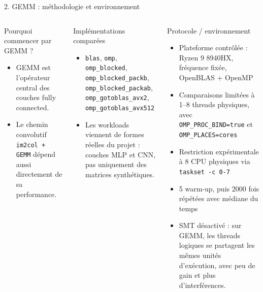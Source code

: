 \documentclass[aspectratio=169]{beamer}
\begin{document}
\begin{frame}{2. GEMM : méthodologie et environnement}
\scriptsize
\begin{columns}[T,totalwidth=\textwidth]
\begin{block}{Pourquoi commencer par GEMM ?}
\begin{itemize}
  \item GEMM est l'opérateur central des couches fully connected.
  \item Le chemin convolutif \texttt{im2col + GEMM} dépend aussi directement de sa performance.
\end{itemize}
\end{block}

\begin{block}{Implémentations comparées}
\begin{itemize}
  \item \texttt{blas}, \texttt{omp}, \texttt{omp\_blocked}, \texttt{omp\_blocked\_packb}, \texttt{omp\_blocked\_packab}, \texttt{omp\_gotoblas\_avx2}, \texttt{omp\_gotoblas\_avx512}
  \item Les workloads viennent de formes réelles du projet : couches MLP et CNN, pas uniquement des matrices synthétiques.
\end{itemize}
\end{block}

\begin{block}{Protocole / environnement}
\begin{itemize}
  \item Plateforme contrôlée : Ryzen 9 8940HX, fréquence fixée, OpenBLAS + OpenMP
  \item Comparaisons limitées à 1--8 threads physiques, avec \texttt{OMP\_PROC\_BIND=true} et \texttt{OMP\_PLACES=cores}
  \item Restriction expérimentale à 8 CPU physiques via \texttt{taskset -c 0-7}
  \item 5 warm-up, puis 2000 fois répétées avec médiane du temps
  \item SMT désactivé : sur GEMM, les threads logiques se partagent les mêmes unités d'exécution, avec peu de gain et plus d'interférences.
\end{itemize}
\end{block}

\end{columns}
\end{frame}
\end{document}
